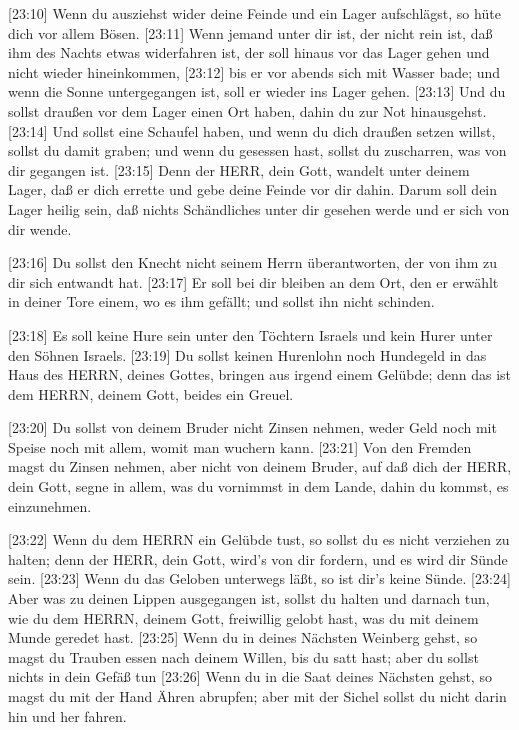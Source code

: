  {[}23:10{]} Wenn du ausziehst wider deine Feinde und ein
Lager aufschlägst, so hüte dich vor allem Bösen. 
{[}23:11{]} Wenn jemand unter dir ist, der nicht rein ist, daß ihm des
Nachts etwas widerfahren ist, der soll hinaus vor das Lager gehen und
nicht wieder hineinkommen,  {[}23:12{]} bis er vor abends
sich mit Wasser bade; und wenn die Sonne untergegangen ist, soll er
wieder ins Lager gehen.  {[}23:13{]} Und du sollst draußen
vor dem Lager einen Ort haben, dahin du zur Not hinausgehst.
 {[}23:14{]} Und sollst eine Schaufel haben, und wenn du
dich draußen setzen willst, sollst du damit graben; und wenn du gesessen
hast, sollst du zuscharren, was von dir gegangen ist. 
{[}23:15{]} Denn der HERR, dein Gott, wandelt unter deinem Lager, daß er
dich errette und gebe deine Feinde vor dir dahin. Darum soll dein Lager
heilig sein, daß nichts Schändliches unter dir gesehen werde und er sich
von dir wende.

 {[}23:16{]} Du sollst den Knecht nicht seinem Herrn
überantworten, der von ihm zu dir sich entwandt hat. 
{[}23:17{]} Er soll bei dir bleiben an dem Ort, den er erwählt in deiner
Tore einem, wo es ihm gefällt; und sollst ihn nicht schinden.

 {[}23:18{]} Es soll keine Hure sein unter den Töchtern
Israels und kein Hurer unter den Söhnen Israels. 
{[}23:19{]} Du sollst keinen Hurenlohn noch Hundegeld in das Haus des
HERRN, deines Gottes, bringen aus irgend einem Gelübde; denn das ist dem
HERRN, deinem Gott, beides ein Greuel.

 {[}23:20{]} Du sollst von deinem Bruder nicht Zinsen
nehmen, weder Geld noch mit Speise noch mit allem, womit man wuchern
kann.  {[}23:21{]} Von den Fremden magst du Zinsen nehmen,
aber nicht von deinem Bruder, auf daß dich der HERR, dein Gott, segne in
allem, was du vornimmst in dem Lande, dahin du kommst, es einzunehmen.

 {[}23:22{]} Wenn du dem HERRN ein Gelübde tust, so sollst
du es nicht verziehen zu halten; denn der HERR, dein Gott, wird's von
dir fordern, und es wird dir Sünde sein.  {[}23:23{]} Wenn
du das Geloben unterwegs läßt, so ist dir's keine Sünde. 
{[}23:24{]} Aber was zu deinen Lippen ausgegangen ist, sollst du halten
und darnach tun, wie du dem HERRN, deinem Gott, freiwillig gelobt hast,
was du mit deinem Munde geredet hast.  {[}23:25{]} Wenn du
in deines Nächsten Weinberg gehst, so magst du Trauben essen nach deinem
Willen, bis du satt hast; aber du sollst nichts in dein Gefäß tun
 {[}23:26{]} Wenn du in die Saat deines Nächsten gehst, so
magst du mit der Hand Ähren abrupfen; aber mit der Sichel sollst du
nicht darin hin und her fahren.


